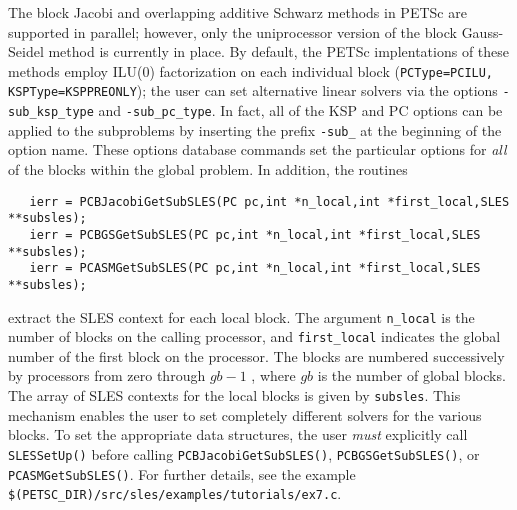  
  
The block Jacobi and overlapping additive Schwarz methods in PETSc are
supported in parallel; however, only the uniprocessor
version of the block Gauss-Seidel method is currently in place.
By default, the PETSc implentations of these methods
employ ILU(0) factorization on each individual block ({\tt PCType=PCILU,
KSPType=KSPPREONLY}); the user can set alternative linear solvers via the options 
 
{\tt -sub\_ksp\_type} and {\tt -sub\_pc\_type}. In fact, all of the KSP
and PC options can be applied to the subproblems by inserting the prefix
{\tt -sub\_} at the beginning of the option name. 
These options database commands set the particular options for {\em all} 
of the blocks within the global problem.  In addition, the routines
\begin{verbatim}
   ierr = PCBJacobiGetSubSLES(PC pc,int *n_local,int *first_local,SLES **subsles);
   ierr = PCBGSGetSubSLES(PC pc,int *n_local,int *first_local,SLES **subsles);
   ierr = PCASMGetSubSLES(PC pc,int *n_local,int *first_local,SLES **subsles);
\end{verbatim}
extract the  SLES context for each local 
block.  The argument {\tt n\_local} is the number of blocks on the 
calling processor, and {\tt first\_local} indicates the global number 
of the first block on the processor. The blocks are numbered 
successively by processors from zero through $ gb-1$ , 
where $ gb $ is the number of global blocks.  
The array of SLES contexts for the local blocks is given by {\tt subsles}. 
This mechanism enables the user to set completely different solvers for the 
various blocks.  To set the appropriate data structures, the 
user {\em must} explicitly call {\tt SLESSetUp()}  
before calling {\tt PCBJacobiGetSubSLES()}, {\tt PCBGSGetSubSLES()}, or
{\tt PCASMGetSubSLES()}.
For further details, see the 
example {\tt \$(PETSC\_DIR)/src/sles/examples/tutorials/ex7.c}.

